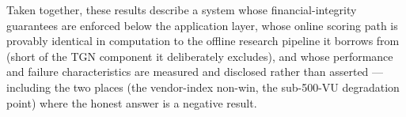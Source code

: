 Taken together, these results describe a system whose financial-integrity guarantees are enforced below the application layer, whose online scoring path is provably identical in computation to the offline research pipeline it borrows from (short of the TGN component it deliberately excludes), and whose performance and failure characteristics are measured and disclosed rather than asserted — including the two places (the vendor-index non-win, the sub-500-VU degradation point) where the honest answer is a negative result.